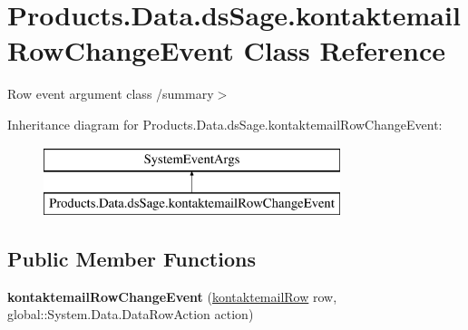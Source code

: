 \hypertarget{class_products_1_1_data_1_1ds_sage_1_1kontaktemail_row_change_event}{}\section{Products.\+Data.\+ds\+Sage.\+kontaktemail\+Row\+Change\+Event Class Reference}
\label{class_products_1_1_data_1_1ds_sage_1_1kontaktemail_row_change_event}


Row event argument class /summary$>$  


Inheritance diagram for Products.\+Data.\+ds\+Sage.\+kontaktemail\+Row\+Change\+Event\+:\begin{figure}[H]
\begin{center}
\leavevmode
\includegraphics[height=2.000000cm]{class_products_1_1_data_1_1ds_sage_1_1kontaktemail_row_change_event}
\end{center}
\end{figure}
\subsection*{Public Member Functions}
\begin{DoxyCompactItemize}
\item 
{\bfseries kontaktemail\+Row\+Change\+Event} (\hyperlink{class_products_1_1_data_1_1ds_sage_1_1kontaktemail_row}{kontaktemail\+Row} row, global\+::\+System.\+Data.\+Data\+Row\+Action action)\hypertarget{class_products_1_1_data_1_1ds_sage_1_1kontaktemail_row_change_event_a5d035eb559ac1a17f6fbeb1a90057dcb}{}\label{class_products_1_1_data_1_1ds_sage_1_1kontaktemail_row_change_event_a5d035eb559ac1a17f6fbeb1a90057dcb}

\end{DoxyCompactItemize}
